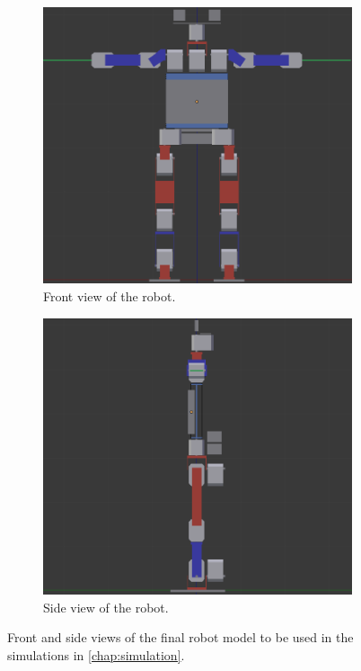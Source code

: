 \begin{figure}[htp]
\center
\begin{subfigure}[b]{0.64\textwidth}
    \includegraphics[width = \textwidth]{figures/robot_v7_front}
    \caption[]{Front view of the robot.}
    \label{fig:robotv7_front}
\end{subfigure}

\begin{subfigure}[b]{0.64\textwidth}
\center
    \includegraphics[width = \textwidth]{figures/robot_v7_side}
    \caption[]{Side view of the robot.}
    \label{fig:robotv7_side}
\end{subfigure}
\caption[Final robot model]{Front and side views of the final robot model to be used in the simulations in \cref{chap:simulation}.}
\label{fig:robotv7}
\end{figure}